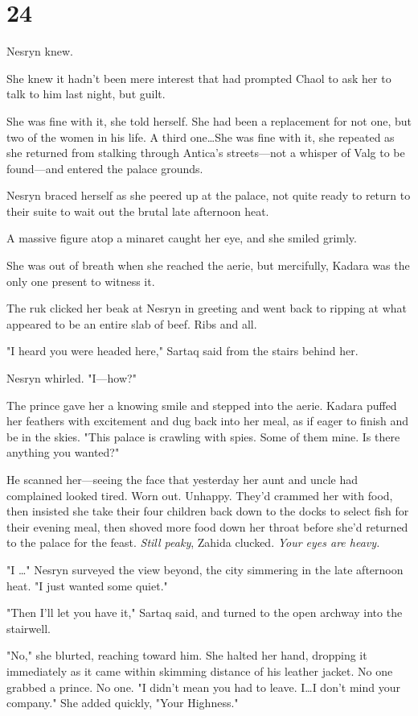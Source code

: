 
\chapter{24}

Nesryn knew.

She knew it hadn't been mere interest that had prompted Chaol to ask her to talk to him last night, but guilt.

She was fine with it, she told herself.
She had been a replacement for not one, but two of the women in his life.
A third one\ldots She was fine with it, she repeated as she returned from stalking through Antica's streets---not a whisper of Valg to be found---and entered the palace grounds.

Nesryn braced herself as she peered up at the palace, not quite ready to return to their suite to wait out the brutal late afternoon heat.

A massive figure atop a minaret caught her eye, and she smiled grimly.

She was out of breath when she reached the aerie, but mercifully, Kadara was the only one present to witness it.

The ruk clicked her beak at Nesryn in greeting and went back to ripping at what appeared to be an entire slab of beef.
Ribs and all.

"I heard you were headed here," Sartaq said from the stairs behind her.

Nesryn whirled.
"I---how?"

The prince gave her a knowing smile and stepped into the aerie.
Kadara puffed her feathers with excitement and dug back into her meal, as if eager to finish and be in the skies.
"This palace is crawling with spies.
Some of them mine.
Is there anything you wanted?"

He scanned her---seeing the face that yesterday her aunt and uncle had complained looked tired.
Worn out.
Unhappy.
They'd crammed her with food, then insisted she take their four children back down to the docks to select fish for their evening meal, then shoved more food down her throat before she'd returned to the palace for the feast.
\emph{Still peaky}, Zahida clucked.
\emph{Your eyes are heavy.}

"I \ldots" Nesryn surveyed the view beyond, the city simmering in the late afternoon heat.
"I just wanted some quiet."

"Then I'll let you have it," Sartaq said, and turned to the open archway into the stairwell.

"No," she blurted, reaching toward him.
She halted her hand, dropping it immediately as it came within skimming distance of his leather jacket.
No one grabbed a prince.
No one.
"I didn't mean you had to leave.
I\ldots I don't mind your company."
She added quickly, "Your Highness."

